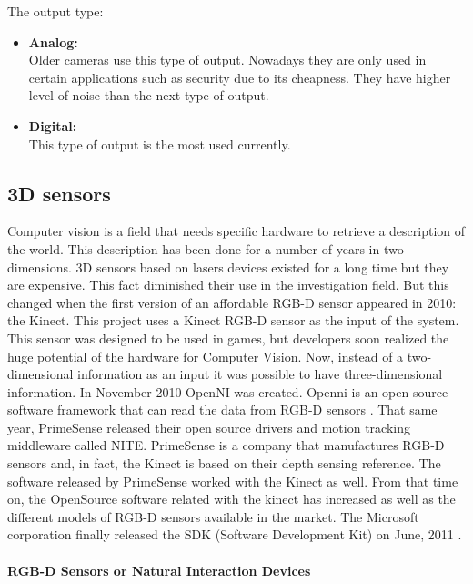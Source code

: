 The output type: 

\begin{itemize}
	\item\textbf{{Analog:}}\\
	Older cameras use this type of output. 
	Nowadays they are only used in certain applications such as security due to its cheapness. 
	They have higher level of noise than the next type of output. 
	\item\textbf{{Digital:}}\\
	This type of output is the most used currently. 

\end{itemize}

\subsection{3D sensors}

Computer vision is a field that needs specific hardware to retrieve a description of the world. 
This description has been done for a number of years in two dimensions. 
3D sensors based on lasers devices existed for a long time but they are expensive. 
This fact diminished their use in the investigation field. 
But this changed when the first version of an affordable RGB-D sensor appeared in 2010: the Kinect. 
This project uses a Kinect RGB-D sensor as the input of the system.
\\

This sensor was designed to be used in games, but developers soon realized the huge potential of the hardware for Computer Vision.  
Now, instead of a two-dimensional information as an input it was possible to have three-dimensional information. 
In November 2010 OpenNI was created. Openni is an open-source software framework that can read the data from RGB-D sensors \cite{openni}.  
That same year, PrimeSense released their open source drivers and motion tracking middleware called NITE\cite{NITE}. 
PrimeSense is a company that manufactures RGB-D sensors and, in fact, the Kinect is based on their depth sensing reference. 
The software released by PrimeSense worked with the Kinect as well. 
From that time on, the OpenSource software related with the kinect has increased as well as the different models of RGB-D sensors available in the market.
The Microsoft corporation finally released the SDK (Software Development Kit) on June, 2011 \cite{kinectSDK}.



\paragraph{RGB-D Sensors or Natural Interaction Devices}\mbox{}\\

